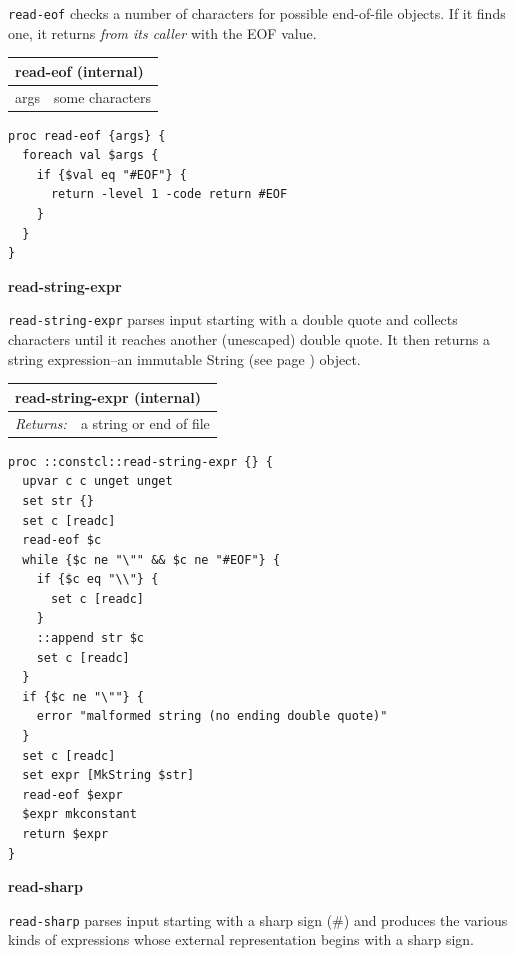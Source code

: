 \documentclass[twoside,9pt]{report}
\begin{document}
\texttt{read-eof} checks a number of characters for possible end-of-file objects. If it finds one, it returns \emph{from its caller} with the EOF value.

\begin{tabular}{ |l l| }
\hline
\multicolumn{2}{|l|}{read-eof (internal)} \\
\hline
args & some characters \\
\hline
\end{tabular}

\noindent\makebox[\linewidth]{\rule{\linewidth}{0.4pt}}
\begin{lstlisting}
proc read-eof {args} {
  foreach val $args {
    if {$val eq "#EOF"} {
      return -level 1 -code return #EOF
    }
  }
}
\end{lstlisting}
\noindent\makebox[\linewidth]{\rule{\linewidth}{0.4pt}}

\textbf{read-string-expr}


\texttt{read-string-expr} parses input starting with a double quote and collects characters until it reaches another (unescaped) double quote. It then returns a string expression--an immutable String (see page \pageref{strings}) object.

\begin{tabular}{ |l l| }
\hline
\multicolumn{2}{|l|}{read-string-expr (internal)} \\
\hline
\textit{Returns:} & a string or end of file \\
\hline
\end{tabular}

\noindent\makebox[\linewidth]{\rule{\linewidth}{0.4pt}}
\begin{lstlisting}
proc ::constcl::read-string-expr {} {
  upvar c c unget unget
  set str {}
  set c [readc]
  read-eof $c
  while {$c ne "\"" && $c ne "#EOF"} {
    if {$c eq "\\"} {
      set c [readc]
    }
    ::append str $c
    set c [readc]
  }
  if {$c ne "\""} {
    error "malformed string (no ending double quote)"
  }
  set c [readc]
  set expr [MkString $str]
  read-eof $expr
  $expr mkconstant
  return $expr
}
\end{lstlisting}
\noindent\makebox[\linewidth]{\rule{\linewidth}{0.4pt}}

\textbf{read-sharp}


\texttt{read-sharp} parses input starting with a sharp sign (\#) and produces the various kinds of expressions whose external representation begins with a sharp sign.
\end{document}
